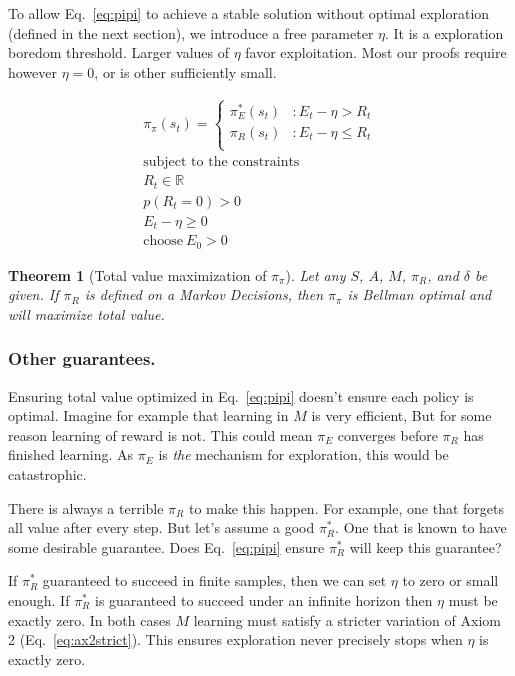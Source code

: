 \documentclass[9pt,lineno]{elife}
\newtheorem{theorem}{Theorem}
\begin{document}
To allow Eq.~\ref{eq:pipi} to achieve a stable solution without optimal exploration (defined in the next section), we introduce a free parameter $\eta$. It is a exploration boredom threshold. Larger values of $\eta$ favor exploitation. Most our proofs require however $\eta = 0$, or is other sufficiently small.

\begin{equation}
\label{eq:pipi} 
	\begin{split}
		\pi_{\pi}(s_t) = 
		\begin{cases}
			\pi^*_E(s_t) & : E_t - \eta > R_t \\
			\pi_R(s_t) & : E_t - \eta \le R_t \\
		\end{cases}
		\\
		\text{subject to the constraints}\\
		R_t \in \mathbb{R} \\
		p(R_t=0) > 0 \\
		E_t - \eta \geq 0 \\
		\text{choose}\ E_0 > 0
	\end{split}
\end{equation}

\begin{theorem}[Total value maximization of $\pi_{\pi}$] \label{theorem:meta_total} 
    \label{theorem:meta} 
	 Let any $S$, $A$, $M$, $\pi_R$, and $\delta$ be given. If $\pi_R$ is defined on a Markov Decisions, then $\pi_\pi$ is Bellman optimal and will maximize total value. 
\end{theorem}

\subsubsection*{Other guarantees.} 
Ensuring total value optimized in Eq.~\ref{eq:pipi} doesn't ensure each policy is optimal. Imagine for example that learning in $M$ is very efficient, But for some reason learning of reward is not. This could mean $\pi_E$ converges before $\pi_R$ has finished learning. As $\pi_E$ is \textit{the} mechanism for exploration, this would be catastrophic.

There is always a terrible $\pi_R$ to make this happen. For example, one that forgets all value after every step. But let's assume a good $\pi^*_R$. One that is known to have some desirable guarantee. Does Eq.~\ref{eq:pipi} ensure $\pi^*_R$ will keep this guarantee?

If $\pi^*_R$ guaranteed to succeed in finite samples, then we can set $\eta$ to zero or small enough. If $\pi^*_R$ is guaranteed to succeed under an infinite horizon then $\eta$ must be exactly zero. In both cases $M$ learning must satisfy a stricter variation of Axiom 2 (Eq.~\ref{eq:ax2strict}). This ensures exploration never precisely stops when $\eta$ is exactly zero.
\end{document}
